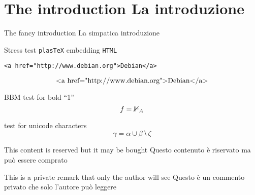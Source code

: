 \section*{\ifCDLeng The introduction \fi  \ifCDLita La introduzione\fi}
\ifCDLeng The fancy introduction \fi  \ifCDLita La simpatica introduzione\fi


\begin{abstract}
  \CDLeng  This simple \LaTeX\ tests some features  of \texttt{plasTeX} and \texttt{ColDoc}.
  \CDLita Questo semplice file  \LaTeX\ mostra le funzionalità di  \texttt{plasTeX} e \texttt{ColDoc}.

  \ifetex Using  \TeX \fi ;
  \ifxetex Using \texttt{XeTeX} \fi ;
  \ifluatex Using \texttt{LuaTeX} \fi ;
  \iftutex Using \texttt{XeTeX} or \texttt{LuaTeX} \fi ;
  \ifplastex Using \texttt{plasTeX} \fi .

\end{abstract}

Stress test  \texttt{plasTeX} embedding \texttt{HTML}
\begin{verbatim}
<a href="http://www.debian.org">Debian</a>
\end{verbatim}
\[ \hbox{<a href="http://www.debian.org">Debian</a>} \]


BBM test for bold ``1''
\[f={\mathbbm{1}}_A\]

test for unicode characters
\[ 𝛾 = 𝛼 ∪ 𝛽 ⧵ 𝜁  \]


\begin{buyablecontent}
  \CDLeng  This content is reserved but it may be bought
  \CDLita  Questo contenuto è riservato ma può essere comprato
\end{buyablecontent}

\begin{privateremark}
  \CDLeng This is a private remark that only the author will see
  \CDLita Questo è un commento privato che solo l'autore può leggere
\end{privateremark}

